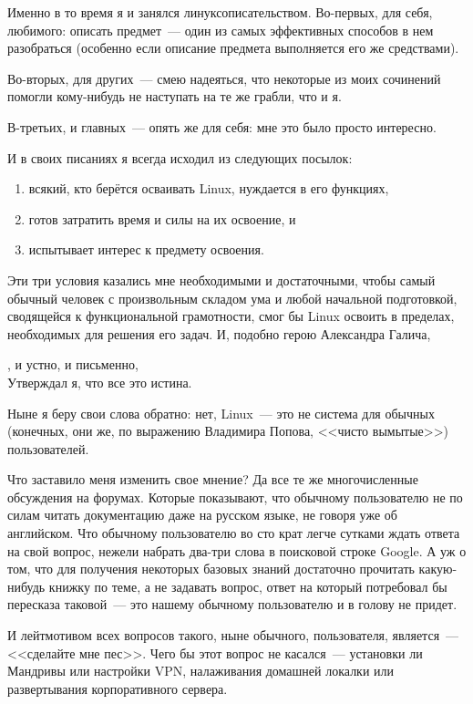 Именно в то время я и занялся линуксописательством. Во-первых, для себя, любимого: описать предмет~--- один из самых эффективных способов в нем разобраться (особенно если описание предмета выполняется его же средствами).

Во-вторых, для других~--- смею надеяться, что некоторые из моих сочинений помогли кому-нибудь не наступать на те же грабли, что и я.

В-третьих, и главных~--- опять же для себя: мне это было просто интересно.

И в своих писаниях я всегда исходил из следующих посылок:
\begin{enumerate}
	\item всякий, кто берётся осваивать Linux, нуждается в его функциях,
	\item готов затратить время и силы на их освоение, и
	\item испытывает интерес к предмету освоения.
\end{enumerate}
Эти три условия казались мне необходимыми и достаточными, чтобы самый обычный человек с произвольным складом ума и любой начальной подготовкой, сводящейся к функциональной грамотности, смог бы Linux освоить в пределах, необходимых для решения его задач. И, подобно герою Александра Галича,

\begin{shadequote}{}
, и устно, и письменно,\\
Утверждал я, что все это истина. 
\end{shadequote}
Ныне я беру свои слова обратно: нет, Linux~--- это не система для обычных (конечных, они же, по выражению Владимира Попова, <<чисто вымытые>>) пользователей.

Что заставило меня изменить свое мнение? Да все те же многочисленные обсуждения на форумах. Которые показывают, что обычному пользователю не по силам читать документацию даже на русском языке, не говоря уже об английском. Что обычному пользователю во сто крат легче сутками ждать ответа на свой вопрос, нежели набрать два-три слова в поисковой строке Google. А уж о том, что для получения некоторых базовых знаний достаточно прочитать какую-нибудь книжку по теме, а не задавать вопрос, ответ на который потребовал бы пересказа таковой~--- это нашему обычному пользователю и в голову не придет.

И лейтмотивом всех вопросов такого, ныне обычного, пользователя, является~--- <<сделайте мне пес>>. Чего бы этот вопрос не касался~--- установки ли Мандривы или настройки VPN, налаживания домашней локалки или развертывания корпоративного сервера.


